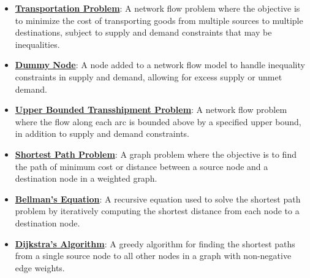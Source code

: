 \documentclass{article}%
\begin{document}
\begin{itemize}[leftmargin=*]%
\item \href{https://www.math.purdue.edu/~yipn/421/2024-11-14-NetAppls.pdf#page=1}{\textbf{Transportation Problem}}: A network flow problem where the objective is to minimize the cost of transporting goods from multiple sources to multiple destinations, subject to supply and demand constraints that may be inequalities.%
\item \href{https://www.math.purdue.edu/~yipn/421/2024-11-14-NetAppls.pdf#page=3}{\textbf{Dummy Node}}: A node added to a network flow model to handle inequality constraints in supply and demand, allowing for excess supply or unmet demand.%
\item \href{https://www.math.purdue.edu/~yipn/421/2024-11-14-NetAppls.pdf#page=9}{\textbf{Upper Bounded Transshipment Problem}}: A network flow problem where the flow along each arc is bounded above by a specified upper bound, in addition to supply and demand constraints.%
\item \href{https://www.math.purdue.edu/~yipn/421/2024-11-14-NetAppls.pdf#page=13}{\textbf{Shortest Path Problem}}: A graph problem where the objective is to find the path of minimum cost or distance between a source node and a destination node in a weighted graph.%
\item \href{https://www.math.purdue.edu/~yipn/421/2024-11-14-NetAppls.pdf#page=16}{\textbf{Bellman's Equation}}: A recursive equation used to solve the shortest path problem by iteratively computing the shortest distance from each node to a destination node.%
\item \href{https://www.math.purdue.edu/~yipn/421/2024-11-14-NetAppls.pdf#page=20}{\textbf{Dijkstra's Algorithm}}: A greedy algorithm for finding the shortest paths from a single source node to all other nodes in a graph with non-negative edge weights.%
\end{itemize}%
\end{document}
